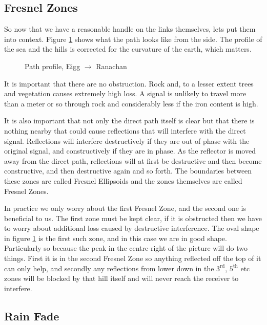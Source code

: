 \newpage
\subsection{Fresnel Zones}

So now that we have a reasonable handle on the links themselves, lets
put them into context. Figure \ref{fig:EIG_RAN_profile} shows what the
path looks like from the side. The profile of the sea and the hills is
corrected for the curvature of the earth, which matters.

\begin{figure}[h]
  \begin{center}
    
    \caption{Path profile, Eigg $\rightarrow$ Ranachan}
    \label{fig:EIG_RAN_profile}
  \end{center}
\end{figure}

It is important that there are no obstruction. Rock and, to a lesser
extent trees and vegetation causes extremely high loss. A signal is
unlikely to travel more than a meter or so through rock and
considerably less if the iron content is high.

It is also important that not only the direct path itself is clear but
that there is nothing nearby that could cause reflections that will
interfere with the direct signal. Reflections will interfere
destructively if they are out of phase with the original signal, and
constructively if they are in phase. As the reflector is moved away
from the direct path, reflections will at first be destructive and
then become constructive, and then destructive again and so forth. The
boundaries between these zones are called Fresnel Ellipsoids and the
zones themselves are called Fresnel Zones.

In practice we only worry about the first Fresnel Zone, and the second
one is beneficial to us. The first zone must be kept clear, if it is
obstructed then we have to worry about additional loss caused by
destructive interference. The oval shape in figure
\ref{fig:EIG_RAN_profile} is the first such zone, and in this case we
are in good shape. Particularly so because the peak in the
centre-right of the picture will do two things. First it is in the
second Fresnel Zone so anything reflected off the top of it can only
help, and secondly any reflections from lower down in the
$3^\mathrm{rd}$, $5^\mathrm{th}$ etc zones will be blocked by that
hill itself and will never reach the receiver to interfere.

\subsection{Rain Fade}


